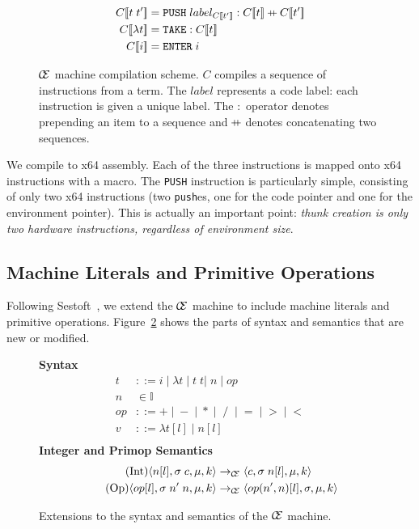 \begin{figure}
\begin{align*} C[\![t \; t']\!] &= \texttt{PUSH}\;label_{C[\![t']\!]}:C[\![t]\!] \concat C[\![t']\!] \\
C[\![\lambda t]\!] &= \texttt{TAKE}:C[\![t]\!] \\
C[\![i]\!] &= \texttt{ENTER} \; i
\end{align*}
\caption{$\mathcal{\mathcal{C} \mskip -4mu \mathcal{E}}$ machine compilation scheme. $C$ compiles a sequence of
instructions from a term. The $label$ represents a code label: each instruction
is given a unique label. The $:$ operator denotes prepending an item to a
sequence and $\concat$ denotes concatenating two sequences.}
\label{fig:cemcompile}
\end{figure}

We compile to x64 assembly. Each of the three instructions is mapped onto
x64 instructions with a macro. The \texttt{PUSH} instruction is particularly
simple, consisting of only two x64 instructions (two \texttt{push}es, one for
the code pointer and one for the environment pointer). This is actually an
important point: \emph{thunk creation is only two hardware instructions,
regardless of environment size}.  

\subsection{Machine Literals and Primitive Operations}

Following Sestoft~\cite{sestoft}, we extend the $\mathcal{\mathcal{C} \mskip -4mu \mathcal{E}}$ machine to
include machine literals and primitive operations. Figure~\ref{fig:extsyntax}
shows the parts of syntax and semantics that are new or modified. 

\begin{figure}
\textbf{Syntax}
\begin{align*}
\tag{Term}    t &::= i \; | \; \lambda t \; | \; t \; t | \; n \; | \; op \\
\tag{Integer} n &\in \mathbb{I} \\
\tag{PrimOp} op &::= + \; | \; - \; | \; * \; | \; \; / \;\; | \; = \; | \; > \; | \; < \\
\tag{Value} v &::= \lambda t[l] \; | \; n[l] \\
\end{align*}
\textbf{Integer and Primop Semantics}
\begin{align*}
\tag{Int}
\langle n[l], \sigma \; c, \mu, k \rangle
  &\rightarrow_{\mathcal{\mathcal{C} \mskip -4mu \mathcal{E}}}
\langle c, \sigma \; n[l], \mu, k \rangle \\
\tag{Op} 
\langle op[l], \sigma \; n' \; n, \mu, k \rangle
  &\rightarrow_{\mathcal{\mathcal{C} \mskip -4mu \mathcal{E}}}
\langle op(n',n)[l], \sigma, \mu, k \rangle
\end{align*}
\caption{Extensions to the syntax and semantics of the $\mathcal{\mathcal{C} \mskip -4mu \mathcal{E}}$ machine.}
\label{fig:extsyntax}
\end{figure}

